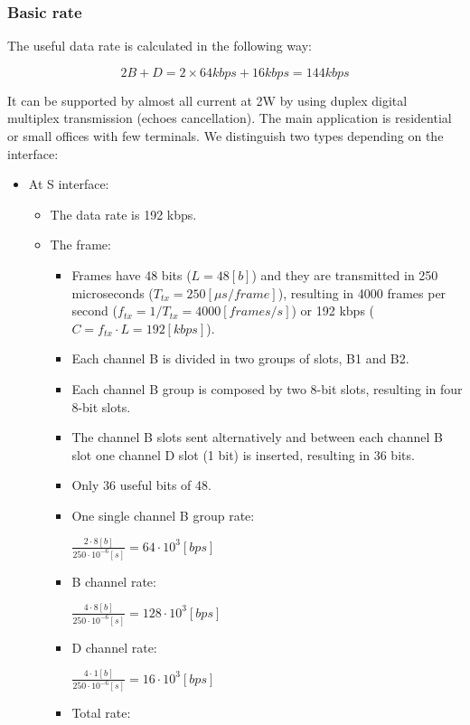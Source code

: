 \documentclass[../main.tex]{subfiles}
\begin{document}
\subsubsection{Basic rate}

The useful data rate is calculated in the following way:

$$
	2B + D = 2 \times 64 kbps + 16 kbps = 144 kbps
$$

It can be supported by almost all current at 2W by using duplex digital multiplex transmission (echoes cancellation). The main application is residential or small offices with few terminals. We distinguish two types depending on the interface:

\begin{itemize}
	\item {
		At S interface:
		\begin{itemize}
			\item The data rate is 192 kbps.
			\item {
				The frame:
				\begin{itemize}
					\item Frames have 48 bits ($L = 48 [b] $) and they are transmitted in 250 microseconds ($T_{tx} = 250 [\mu s/frame]$), resulting in 4000 frames per second ($f_{tx} = 1/T_{tx} = 4000 [frames/s]$) or 192 kbps ($C = f_{tx} \cdot L = 192 [kbps]$).
					\item Each channel B is divided in two groups of slots, B1 and B2.
					\item Each channel B group is composed by two 8-bit slots, resulting in four 8-bit slots.
					\item The channel B slots sent alternatively and between each channel B slot one channel D slot (1 bit) is inserted, resulting in 36 bits.
					\item Only 36 useful bits of 48.
					\item {
						One single channel B group rate:

						$
							\frac {2 \cdot 8 [b]} {250 \cdot 10^{-6} [s]} = 64 \cdot 10^3 [bps]
						$
					}
					\item {
						B channel rate:

						$
							\frac {4 \cdot 8 [b]} {250 \cdot 10^{-6} [s]} = 128 \cdot 10^3 [bps]
						$
					}
					\item {
						D channel rate:

						$
							\frac {4 \cdot 1 [b]} {250 \cdot 10^{-6} [s]} = 16 \cdot 10^3 [bps]
						$
					}
					\item {
						Total rate:

}
\end{itemize}}
\end{itemize}}
\end{itemize}
\end{document}
